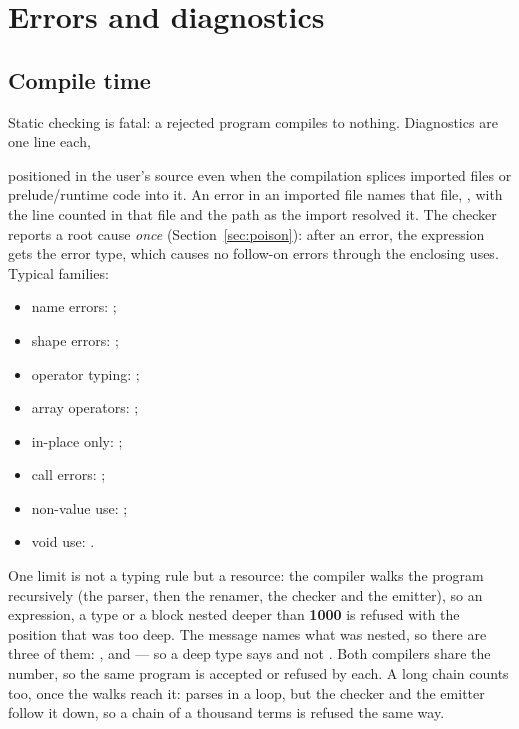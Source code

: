 \section{Errors and diagnostics}
\label{sec:errors}

\subsection{Compile time}

Static checking is fatal: a rejected program compiles to nothing.
Diagnostics are one line each,

\begin{center}
\end{center}

\noindent positioned in the user's source even when the compilation
splices imported files or prelude/runtime code into it. An error in an
imported file names that file, , with
the line counted in that file and the path as the import resolved it.
The checker reports a root
cause \emph{once} (Section~\ref{sec:poison}): after an error, the
expression gets the error type, which causes no follow-on errors
through the enclosing uses. Typical families:

\begin{itemize}[nosep]
\item name errors: ;
\item shape errors: ;
\item operator typing: ;
\item array operators: ;
\item in-place only: ;
\item call errors: ;
\item non-value use: ;
\item void use: .
\end{itemize}

\noindent One limit is not a typing rule but a resource: the compiler
walks the program recursively (the parser, then the renamer, the
checker and the emitter), so an expression, a type or a block nested
deeper than \textbf{1000} is refused with the position that was too
deep. The message names what was nested, so there are three of them:
,
 and
 --- so a deep type says
 and not .
Both compilers share the number, so the same program
is accepted or refused by each. A long chain counts too, once the
walks reach it:  parses in a loop, but the checker and
the emitter follow it down, so a chain of a thousand terms is refused
the same way.

